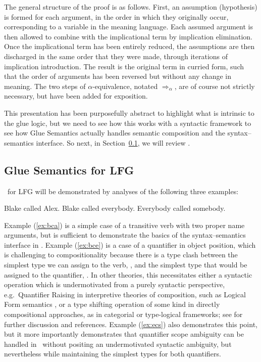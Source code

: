 \noindent
The general structure of the proof is as follows. First, an assumption (hypothesis)
 is formed for each argument, in the order in which they
originally occur, corresponding to a variable in the meaning
language. Each assumed argument is then allowed to combine with the
implicational term by implication elimination. Once the implicational
term has been entirely reduced, the assumptions are then discharged in
the same order that they were made, through iterations of implication
introduction. The result is the original term in curried form, such
that the order of arguments has been reversed but without any change
in meaning. The two steps of $\alpha$-equivalence, notated
$\Rightarrow_\alpha$, are of course  not strictly
necessary, but have been added for exposition. 

This presentation has been purposefully abstract to highlight what is
intrinsic to the glue logic, but we  need to see how this
 works with a syntactic framework to see how Glue Semantics
actually handles semantic composition and the syntax--semantics interface. So next, in
Section~\ref{sec:glue-lfg}, we will review \lfgglue.

\subsection{Glue Semantics for LFG}
\label{sec:glue-lfg}

\glue\ for LFG will be demonstrated by analyses of the following three
examples:

\begin{exe}
\ex \label{ex:bca} Blake called Alex.
\ex \label{ex:bce} Blake called everybody.
\ex \label{ex:ecs} Everybody called somebody.
\end{exe}
%
Example (\ref{ex:bca}) is a simple case of a transitive verb with two
proper name arguments, but is sufficient to demonstrate the basics of
the syntax--semantics interface in \lfgglue. Example (\ref{ex:bce}) is a
case of a quantifier in object position, which is challenging to
compositionality because there is a type clash between the simplest
type we can assign to the verb, , and the
simplest type that would be assigned to the  quantifier,
. In other theories, this necessitates either
a syntactic operation which is undermotivated from a purely syntactic perspective, e.g.\  
Quantifier Raising in interpretive theories of composition, such as Logical Form semantics \citep{heim;kratzer98},
or a type shifting operation of some kind in directly compositional
approaches, as in categorial or type-logical frameworks; see
\citet[Chapter 14]{jacobson14} for further discussion and references. Example
(\ref{ex:ecs}) also demonstrates this point, but it more importantly
demonstrates that quantifier scope ambiguity can be handled in \glue\
 without positing an undermotivated syntactic ambiguity, but nevertheless  while
maintaining the simplest types for both quantifiers.

